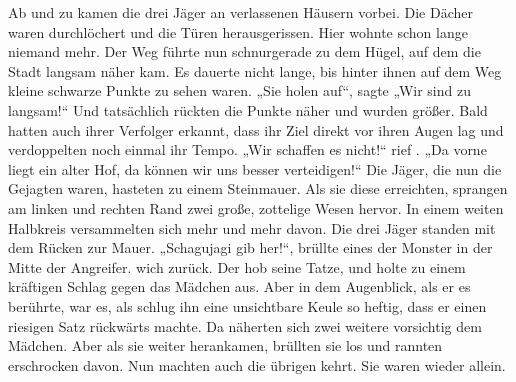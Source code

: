 \begin{huge}
Ab und zu kamen die drei Jäger an verlassenen Häusern vorbei. Die Dächer waren durchlöchert und die Türen herausgerissen. Hier wohnte schon lange niemand mehr. Der Weg führte nun schnurgerade zu dem Hügel, auf dem die Stadt langsam näher kam. Es dauerte nicht lange, bis hinter ihnen auf dem Weg kleine schwarze Punkte zu sehen waren. „Sie holen auf“, sagte \Dolo{,} „Wir sind zu langsam!“ Und tatsächlich rückten die Punkte näher und wurden größer. Bald hatten auch ihrer Verfolger erkannt, dass ihr Ziel direkt vor ihren Augen lag und verdoppelten noch einmal ihr Tempo. „Wir schaffen es nicht!“ rief \Bomar. „Da vorne liegt ein alter Hof, da können wir uns besser verteidigen!“ Die Jäger, die nun die Gejagten waren, hasteten zu einem Steinmauer. Als sie diese erreichten, sprangen am linken und rechten Rand zwei große, zottelige Wesen hervor. In einem weiten Halbkreis versammelten sich mehr und mehr davon. Die drei Jäger standen mit dem Rücken zur Mauer. „Schagujagi gib her!“, brüllte eines der Monster in der Mitte der Angreifer. \Eno wich zurück. Der \Bangiri hob seine Tatze, und holte zu einem kräftigen Schlag gegen das Mädchen aus. Aber in dem Augenblick, als er es berührte, war es, als schlug ihn eine unsichtbare Keule so heftig, dass er einen riesigen Satz rückwärts machte. Da näherten sich zwei weitere \Bangiri vorsichtig dem Mädchen. Aber als sie weiter herankamen, brüllten sie los und rannten erschrocken davon. Nun machten auch die übrigen \Bangiri kehrt. Sie waren wieder allein.


\end{huge}
